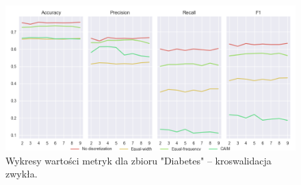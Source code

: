 
\begin{figure}[H]
    \center
    \includegraphics[width=\textwidth]{img/cv_scores_kfold/scoring_kfold_diabetes.png}
    \caption{Wykresy wartości metryk dla zbioru "Diabetes" -- kroswalidacja zwykła.}
\end{figure}

